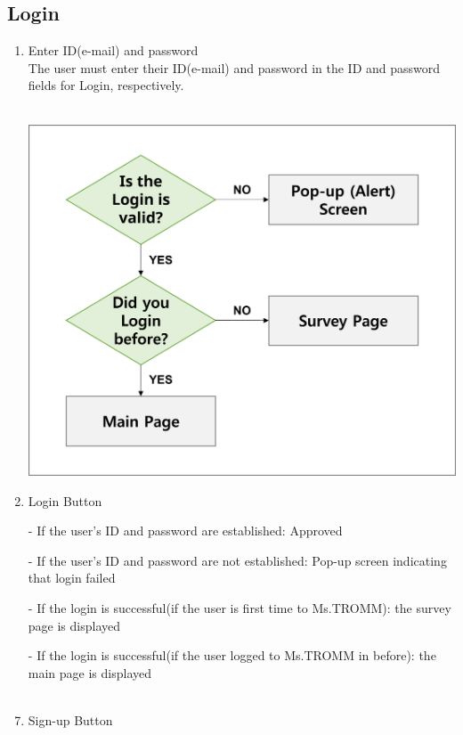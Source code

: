 \documentclass[conference]{IEEEtran}
\begin{document}
\break

\subsection{Login}
\begin{enumerate}
    \item Enter ID(e-mail) and password\\
        The user must enter their ID(e-mail) and password in the ID and password fields for Login, respectively. \\ \\
    \centerline{\includegraphics[scale=0.5]{assets/flow_2.png}}
    \item Login Button\\
        \item[-] If the user’s ID and password are established: Approved\\
        \item[-] If the user’s ID and password are not established: Pop-up screen indicating that login failed\\
        \item[-] If the login is successful(if the user is first time to Ms.TROMM): the survey page is displayed\\
        \item[-] If the login is successful(if the user logged to Ms.TROMM in before): the main page is displayed\\ \\
    \item Sign-up Button\\

\end{enumerate}
\end{document}
